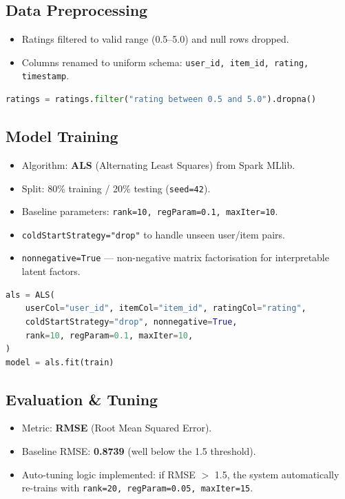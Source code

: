 \documentclass[12pt,a4paper]{article}
\begin{document}
\subsection{Data Preprocessing}
\begin{itemize}
  \item Ratings filtered to valid range (0.5--5.0) and null rows dropped.
  \item Columns renamed to uniform schema: \texttt{user\_id, item\_id, rating, timestamp}.
\end{itemize}

\begin{lstlisting}[language=Python,caption={Data cleaning}]
ratings = ratings.filter("rating between 0.5 and 5.0").dropna()
\end{lstlisting}

\subsection{Model Training}
\begin{itemize}
  \item Algorithm: \textbf{ALS} (Alternating Least Squares) from Spark MLlib.
  \item Split: 80\% training / 20\% testing (\texttt{seed=42}).
  \item Baseline parameters: \texttt{rank=10, regParam=0.1, maxIter=10}.
  \item \texttt{coldStartStrategy="drop"} to handle unseen user/item pairs.
  \item \texttt{nonnegative=True} --- non-negative matrix factorisation for interpretable latent factors.
\end{itemize}

\begin{lstlisting}[language=Python,caption={ALS model training}]
als = ALS(
    userCol="user_id", itemCol="item_id", ratingCol="rating",
    coldStartStrategy="drop", nonnegative=True,
    rank=10, regParam=0.1, maxIter=10,
)
model = als.fit(train)
\end{lstlisting}

\subsection{Evaluation \& Tuning}
\begin{itemize}
  \item Metric: \textbf{RMSE} (Root Mean Squared Error).
  \item Baseline RMSE: \textbf{0.8739} (well below the 1.5 threshold).
  \item Auto-tuning logic implemented: if RMSE $>$ 1.5, the system automatically re-trains with \texttt{rank=20, regParam=0.05, maxIter=15}.
\end{itemize}
\end{document}
